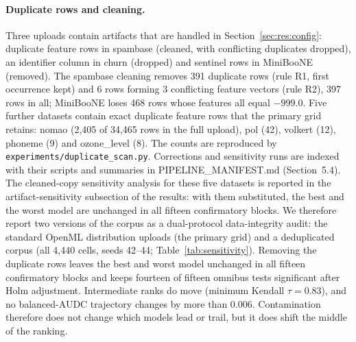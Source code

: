\documentclass[pdflatex,sn-mathphys]{sn-jnl}
\theoremstyle{thmstyleone}
\theoremstyle{thmstyletwo}
\theoremstyle{thmstylethree}
\begin{document}
\paragraph{Duplicate rows and cleaning.} Three uploads contain artifacts that are handled in Section~\ref{sec:res:config}: duplicate feature rows in spambase (cleaned, with conflicting duplicates dropped), an identifier column in churn (dropped) and sentinel rows in MiniBooNE (removed). The spambase cleaning removes 391 duplicate rows (rule R1, first occurrence kept) and 6 rows forming 3 conflicting feature vectors (rule R2), 397 rows in all; MiniBooNE loses 468 rows whose features all equal $-999.0$. Five further datasets contain exact duplicate feature rows that the primary grid retains: nomao (2,405 of 34,465 rows in the full upload), pol (42), volkert (12), phoneme (9) and ozone\_level (8). The counts are reproduced by \texttt{experiments/duplicate\_scan.py}. Corrections and sensitivity runs are indexed with their scripts and summaries in PIPELINE\_MANIFEST.md (Section~5.4). The cleaned-copy sensitivity analysis for these five datasets is reported in the artifact-sensitivity subsection of the results: with them substituted, the best and the worst model are unchanged in all fifteen confirmatory blocks. We therefore report two versions of the corpus as a dual-protocol data-integrity audit: the standard OpenML distribution uploads (the primary grid) and a deduplicated corpus (all 4,440 cells, seeds 42--44; Table~\ref{tab:sensitivity}). Removing the duplicate rows leaves the best and worst model unchanged in all fifteen confirmatory blocks and keeps fourteen of fifteen omnibus tests significant after Holm adjustment. Intermediate ranks do move (minimum Kendall $\tau=0.83$), and no balanced-AUDC trajectory changes by more than $0.006$. Contamination therefore does not change which models lead or trail, but it does shift the middle of the ranking.
\end{document}

